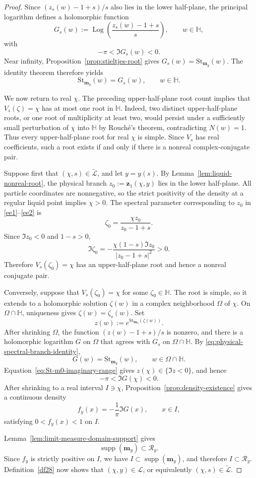 \documentclass[11pt]{amsart}
\theoremstyle{plain}
\newcommand\bm{\mathbf{m}}
\numberwithin{equation}{section}
\numberwithin{theorem}{section}
\numberwithin{figure}{section}
\begin{document}
\begin{proof}
Since $(z_s(w)-1+s)/s$ also lies in the lower half-plane, the principal
logarithm defines a holomorphic function
\[
    G_s(w)
    :=
    \operatorname{Log}\left(
        \frac{z_s(w)-1+s}{s}
    \right),
    \qquad w\in\mathbb H,
\]
with
\[
    -\pi<\Im G_s(w)<0.
\]
Near infinity, Proposition~\ref{prop:stieltjes-root} gives
$G_s(w)=\mathrm{St}_{\bm_y}(w)$. The identity theorem therefore yields
\begin{equation}
    \mathrm{St}_{\bm_y}(w)=G_s(w),
    \qquad w\in\mathbb H.
    \label{eq:physical-spectral-branch-identity}
\end{equation}

We now return to real $\chi$. The preceding upper-half-plane root count
implies that $V_s(\zeta)=\chi$ has at most one root in $\mathbb H$.
Indeed, two distinct upper-half-plane roots, or one root of multiplicity
at least two, would persist under a sufficiently small perturbation of
$\chi$ into $\mathbb H$ by Rouch\'e's theorem, contradicting $N(w)=1$.
Thus every upper-half-plane root for real $\chi$ is simple. Since
$V_s$ has real coefficients, such a root exists if and only if there is
a nonreal complex-conjugate pair.

Suppose first that $(\chi,s)\in\widetilde{\mathcal L}$, and let
$y=y(s)$. By Lemma~\ref{lem:liquid-nonreal-root}, the physical branch
$z_0:=\mathbf z_1(\chi,y)$ lies in the lower half-plane. All particle
coordinates are nonnegative, so the strict positivity of the density at
a regular liquid point implies $\chi>0$. The spectral parameter
corresponding to $z_0$ in \eqref{ee1}--\eqref{ee2} is
\[
    \zeta_0
    =
    \frac{\chi z_0}{z_0-1+s}.
\]
Since $\Im z_0<0$ and $1-s>0$,
\[
    \Im\zeta_0
    =
    -\frac{\chi(1-s)\Im z_0}
          {|z_0-1+s|^2}
    >0.
\]
Therefore $V_s(\zeta_0)=\chi$ has an upper-half-plane root and hence a
nonreal conjugate pair.

Conversely, suppose that $V_s(\zeta_0)=\chi$ for some
$\zeta_0\in\mathbb H$. The root is simple, so it extends to a
holomorphic solution $\zeta(w)$ in a complex neighborhood $\Omega$ of
$\chi$. On $\Omega\cap\mathbb H$, uniqueness gives
$\zeta(w)=\zeta_s(w)$. Set
\[
    z(w)
    :=
    e^{\mathrm{St}_{\bm_0}(\zeta(w))}.
\]
After shrinking $\Omega$, the function $(z(w)-1+s)/s$ is nonzero, and
there is a holomorphic logarithm $G$ on $\Omega$ that agrees with
$G_s$ on $\Omega\cap\mathbb H$. By
\eqref{eq:physical-spectral-branch-identity},
\[
    G(w)=\mathrm{St}_{\bm_y}(w),
    \qquad w\in\Omega\cap\mathbb H.
\]
Equation~\eqref{eq:St-m0-imaginary-range} gives
$z(\chi)\in\{\Im z<0\}$, and hence
\[
    -\pi<\Im G(\chi)<0.
\]
After shrinking to a real interval $I\ni\chi$,
Proposition~\ref{prop:density-existence} gives a continuous density
\[
    f_y(x)
    =
    -\frac{1}{\pi}\Im G(x),
    \qquad x\in I,
\]
satisfying $0<f_y(x)<1$ on $I$.

Lemma~\ref{lem:limit-measure-domain-support} gives
\[
    \operatorname{supp}(\bm_y)\subset\mathcal R_y.
\]
Since $f_y$ is strictly positive on $I$, we have
$I\subset\operatorname{supp}(\bm_y)$, and therefore
$I\subset\mathcal R_y$. Definition~\ref{df28} now shows that
$(\chi,y)\in\mathcal L$, or equivalently
$(\chi,s)\in\widetilde{\mathcal L}$.
\end{proof}
\end{document}
